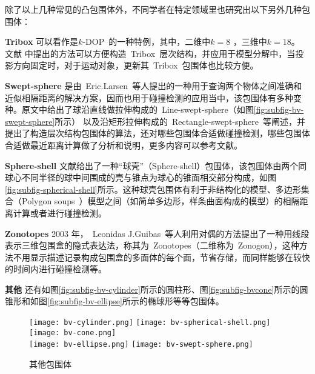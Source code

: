 除了以上几种常见的凸包围体外，不同学者在特定领域里也研究出以下另外几种包围体：\\
\begin{inparaenum}[(1)]
\indent
\item \textbf{Tribox} 可以看作是$k$-DOP~的一种特例，其中，二维中$k=8$ ，三维中$k=18$。 文献 中提出的方法可以方便构造~Tribox~层次结构，并应用于模型分解中，当投影方向固定时，对于运动对象，更新其~Tribox~包围体也比较方便。 \\ 
\indent
\item \textbf{Swept-sphere}
是由~Eric.Larsen~等人\cite{Larsen1999Fast}提出的一种用于查询两个物体之间准确和近似相隔距离的解决方案，因而也用于碰撞检测的应用当中，该包围体有多种变种。原文中给出了球沿直线做拉伸构成的~Line-swept-sphere（如图\ref{fig:subfig-bv-swept-sphere}所示）
以及沿矩形拉伸构成的~Rectangle-swept-sphere~等阐述，并提出了构造层次结构包围体的算法，还对哪些包围体合适做碰撞检测，哪些包围体合适做最近距离计算做了分析和说明，更多内容可以参考文献。\\
\indent
\item \textbf{Sphere-shell}
文献给出了一种“球壳”（Sphere-shell）包围体，该包围体由两个同球心不同半径的球中间围成的壳与锥点为球心的锥面相交部分构成，如图\ref{fig:subfig-spherical-shell}所示。这种球壳包围体有利于非结构化的模型、多边形集合（Polygon
soups~）模型之间（如简单多边形，样条曲面构成的模型）的相隔距离计算或者进行碰撞检测。\\
\indent
\item \textbf{Zonotopes} 2003 年，~Leonidas
J.Guibas~\cite{Guibas2003Zonotopes}等人利用对偶的方法提出了一种用线段表示三维包围盒的隐式表达法，称其为~Zonotopes（二维称为~Zonogon），这种方法不用显示描述记录构成包围盒的多面体的每个面，节省存储，而同样能够在较快的时间内进行碰撞检测等。\\
\indent
\item \textbf{其他}
还有如图\ref{fig:subfig-bv-cylinder}所示的圆柱形\cite{Schomer2000Smallest}、图\ref{fig:subfig-bvcone}所示的圆锥形\cite{held1997erit}和如图\ref{fig:subfig-bv-ellipse}所示的椭球形\cite{Wang2004Efficient}等等包围体。
\end{inparaenum}

\begin{figure}[H]
  \centering%
    {\texttt{[image: bv-cylinder.png]}}
    {\texttt{[image: bv-spherical-shell.png]}}
    {\texttt{[image: bv-cone.png]}}
  \\
    {\texttt{[image: bv-ellipse.png]}}
    {\texttt{[image: bv-swept-sphere.png]}}
  \caption{其他包围体}
  \label{fig:bv-others}
\end{figure}

